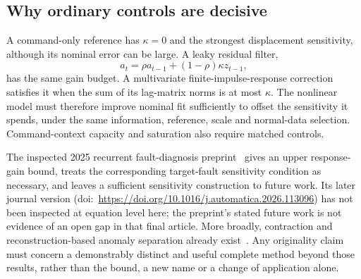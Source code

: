 \subsection{Why ordinary controls are decisive}
A command-only reference has $\kappa=0$ and the strongest displacement sensitivity, although its nominal error can be large. A leaky residual filter,
\begin{equation}
 a_t=\rho a_{t-1}+(1-\rho)\kappa z_{t-1},
\end{equation}
has the same gain budget. A multivariate finite-impulse-response correction satisfies it when the sum of its lag-matrix norms is at most $\kappa$. The nonlinear model must therefore improve nominal fit sufficiently to offset the sensitivity it spends, under the same information, reference, scale and normal-data selection. Command-context capacity and saturation also require matched controls.

The inspected 2025 recurrent fault-diagnosis preprint~\cite{renpreprint} gives an upper response-gain bound, treats the corresponding target-fault sensitivity condition as necessary, and leaves a sufficient sensitivity construction to future work. Its later journal version (doi:~\url{https://doi.org/10.1016/j.automatica.2026.113096}) has not been inspected at equation level here; the preprint's stated future work is not evidence of an open gap in that final article. More broadly, contraction and reconstruction-based anomaly separation already exist~\cite{iresnet,lipschitzauto,diffint}. Any originality claim must concern a demonstrably distinct and useful complete method beyond those results, rather than the bound, a new name or a change of application alone.
